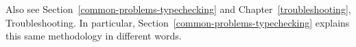 Also see
Section~\ref{common-problems-typechecking} and
Chapter~\ref{troubleshooting}, Troubleshooting.
In particular, Section~\ref{common-problems-typechecking} explains this
same methodology in different words.


